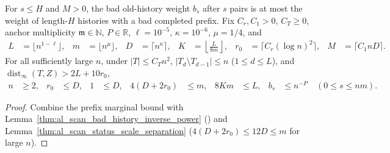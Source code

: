 \begin{lemma}
    \label{thm:al_scan_uniform_bad_old}
    \leanok
    For $s\le H$ and $M>0$, the bad old-history weight $b_s$ after $s$ pairs is
    at most the weight of length-$H$ histories with a bad completed prefix. Fix
    $C_r,C_1>0$, $C_T\ge0$, anchor multiplicity $\mathfrak m\in\mathbb N$,
    $P\in\mathbb R$, $\ell=10^{-5}$, $\kappa=10^{-6}$, $\mu=1/4$, and
    \begin{align}
        L   & =\lfloor n^{1-\ell}\rfloor,             & m & =\lfloor n^\mu\rfloor, &
        D   & =\lceil n^\kappa\rceil,                 &
        K   & =\left\lfloor\frac{L}{8m}\right\rfloor, &
        r_0 & =\lceil C_r(\log n)^2\rceil,            & M & =\lceil C_1nD\rceil.
        \label{eq:al_scan_uniform_tail_scales}
    \end{align}
    For all sufficiently large $n$, under $|T|\le C_Tn^2$,
    $|T_d\setminus T_{d-1}|\le n$ ($1\le d\le L$), and
    $\operatorname{dist}_\infty(T,Z)>2L+10r_0$,
    \begin{align}
        n   & \ge2,                          & r_0 & \le D, & 1 & \le D, & 4(D+2r_0) & \le m, & 8Km & \le L, &
        b_s & \le n^{-P}\quad(0\le s\le nm).
        \label{eq:al_scan_uniform_bad_old}
    \end{align}
\end{lemma}
\begin{proof}\leanok
    Combine the prefix marginal bound with
    Lemma~\ref{thm:al_scan_bad_history_inverse_power}
    (\cite[Lemma~9.1]{OpenAI2026AreaLaw}) and
    Lemma~\ref{thm:al_scan_status_scale_separation} ($4(D+2r_0)\le12D\le m$
    for large $n$).
\end{proof}

